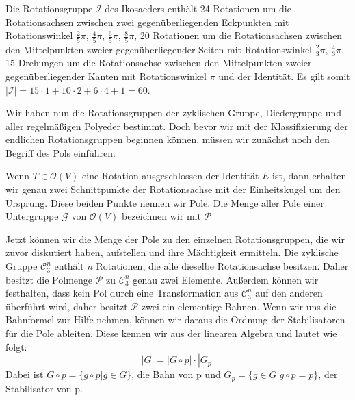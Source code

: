 Die Rotationsgruppe $\mathcal{I}$ des Ikosaeders enthält 24 Rotationen um die Rotationsachsen zwischen zwei gegenüberliegenden Eckpunkten mit Rotationswinkel $\frac{2}{5}\pi$, $\frac{4}{5}\pi$, $\frac{6}{5}\pi$, $\frac{8}{5}\pi$, 20 Rotationen um die Rotationsachsen zwischen den Mittelpunkten zweier gegenüberliegender Seiten mit Rotationswinkel $\frac{2}{3}\pi$, $\frac{4}{3}\pi$, 15 Drehungen um die Rotationsachse zwischen den Mittelpunkten zweier gegenüberliegender Kanten mit Rotationswinkel $\pi$ und der Identität. Es gilt somit $| \mathcal{I} | = 15 \cdot 1 + 10 \cdot 2 + 6 \cdot 4 + 1 = 60$.

Wir haben nun die Rotationsgruppen der zyklischen Gruppe, Diedergruppe und aller regelmäßigen Polyeder bestimmt. Doch bevor wir mit der Klassifizierung der endlichen Rotationsgruppen beginnen können, müssen wir zunächst noch den Begriff des Pols einführen.

\begin{defi}[Pole]
	Wenn $T \in \mathcal{O}(V)$ eine Rotation ausgeschlossen der Identität $E$ ist, dann erhalten wir genau zwei Schnittpunkte der Rotationsachse mit der Einheitskugel um den Ursprung. Diese beiden Punkte nennen wir Pole. Die Menge aller Pole einer Untergruppe $\mathcal{G}$ von $\mathcal{O}(V)$ bezeichnen wir mit $\mathcal{P}$
\end{defi} 

Jetzt können wir die Menge der Pole zu den einzelnen Rotationsgruppen, die wir zuvor diskutiert haben, aufstellen und ihre Mächtigkeit ermitteln. Die zyklische Gruppe $\mathcal{C}^n_3$ enthält $n$ Rotationen, die alle dieselbe Rotationsachse besitzen. Daher besitzt die Polmenge $\mathcal{P}$ zu $\mathcal{C}^n_3$ genau zwei Elemente. Außerdem können wir festhalten, dass kein Pol durch eine Transformation aus $\mathcal{C}^n_3$ auf den anderen überführt wird, daher besitzt $\mathcal{P}$ zwei ein-elementige Bahnen. Wenn wir uns die Bahnformel zur Hilfe nehmen, können wir daraus die Ordnung der Stabilisatoren für die Pole ableiten. Diese kennen wir aus der linearen Algebra und lautet wie folgt:
$$ |G| = |G \circ p| \cdot |G_p| $$
Dabei ist $G \circ p = \{g \circ p | g \in G\}$, die Bahn von p und $G_p = \{g \in G | g \circ p = p \}$, der Stabilisator von p. 

